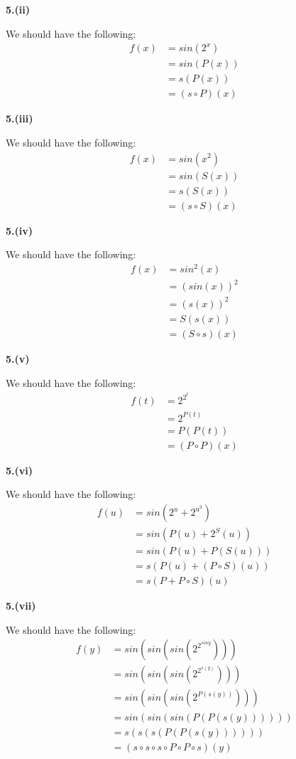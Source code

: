 \documentclass[a4paper,12pt]{report}
\begin{document}
\noindent
\textbf{5.(ii)}

\noindent
We should have the following:
\begin{align*}
f(x)&=sin(2^x)\\
&=sin(P(x))\\
&=s(P(x))\\
&=(s\circ P)(x)
\end{align*}

\noindent
\textbf{5.(iii)}

\noindent
We should have the following:
\begin{align*}
f(x)&=sin(x^2)\\
&=sin(S(x))\\
&=s(S(x))\\
&=(s\circ S)(x)
\end{align*}

\noindent
\textbf{5.(iv)}

\noindent
We should have the following:
\begin{align*}
f(x)&=sin^2(x)\\
&=(sin(x))^2\\
&=(s(x))^2\\
&=S(s(x))\\
&=(S\circ s)(x)
\end{align*}

\noindent
\textbf{5.(v)}

\noindent
We should have the following:
\begin{align*}
f(t)&=2^{2^t}\\
&=2^{P(t)}\\
&=P(P(t))\\
&=(P\circ P)(x)
\end{align*}

\pagebreak
\noindent
\textbf{5.(vi)}

\noindent
We should have the following:
\begin{align*}
f(u)&=sin(2^u+2^{u^2})\\
&=sin(P(u)+2^S(u))\\
&=sin(P(u)+P(S(u)))\\
&=s(P(u)+(P\circ S)(u))\\
&=s(P+P\circ S)(u)
\end{align*}

\noindent
\textbf{5.(vii)}

\noindent
We should have the following:
\begin{align*}
f(y)&=sin(sin(sin(2^{2^{sin y}})))\\
&=sin(sin(sin(2^{2^{s(y)}})))\\
&=sin(sin(sin(2^{P(s(y))})))\\
&=sin(sin(sin(P(P(s(y))))))\\
&=s(s(s(P(P(s(y))))))\\
&=(s\circ s\circ s\circ P\circ P\circ s)(y)
\end{align*}
\end{document}
